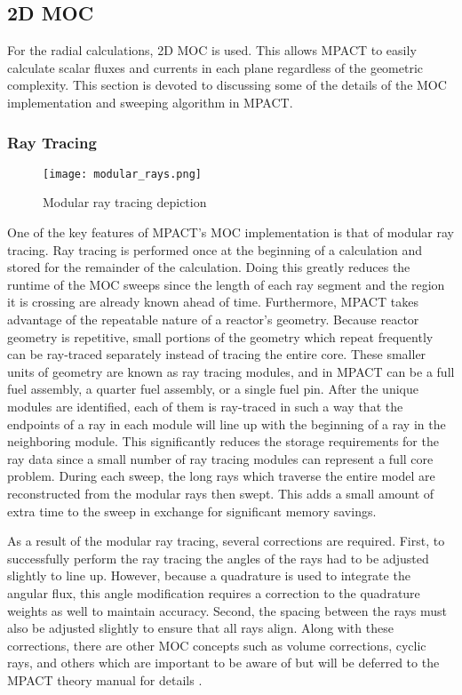 \subsection{2D MOC}

For the radial calculations, 2D MOC is used.  This allows MPACT to easily calculate scalar fluxes and currents in each plane regardless of the geometric complexity.  This section is devoted to discussing some of the details of the MOC implementation and sweeping algorithm in MPACT.

\subsubsection{Ray Tracing}

\begin{figure}[h]
    \centering
    \texttt{[image: modular\_rays.png]}
    \caption[Modular Ray Tracing]{Modular ray tracing depiction \cite{MPACTTheoryManual}}\label{e:ModRays}
\end{figure}

One of the key features of MPACT's MOC implementation is that of modular ray tracing.  Ray tracing is performed once at the beginning of a calculation and stored for the remainder of the calculation.  Doing this greatly reduces the runtime of the MOC sweeps since the length of each ray segment and the region it is crossing are already known ahead of time.  Furthermore, MPACT takes advantage of the repeatable nature of a reactor's geometry.  Because reactor geometry is repetitive, small portions of the geometry which repeat frequently can be ray-traced separately instead of tracing the entire core.  These smaller units of geometry are known as ray tracing modules, and in MPACT can be a full fuel assembly, a quarter fuel assembly, or a single fuel pin.  After the unique modules are identified, each of them is ray-traced in such a way that the endpoints of a ray in each module will line up with the beginning of a ray in the neighboring module.  This significantly reduces the storage requirements for the ray data since a small number of ray tracing modules can represent a full core problem.  During each sweep, the long rays which traverse the entire model are reconstructed from the modular rays then swept.  This adds a small amount of extra time to the sweep in exchange for significant memory savings.

As a result of the modular ray tracing, several corrections are required.  First, to successfully perform the ray tracing the angles of the rays had to be adjusted slightly to line up.  However, because a quadrature is used to integrate the angular flux, this angle modification requires a correction to the quadrature weights as well to maintain accuracy.  Second, the spacing between the rays must also be adjusted slightly to ensure that all rays align.  Along with these corrections, there are other MOC concepts such as volume corrections, cyclic rays, and others which are important to be aware of but will be deferred to the MPACT theory manual for details \cite{MPACTTheoryManual}.

